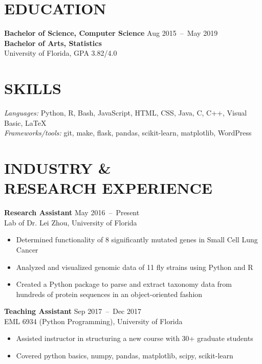 \documentclass[line,resmargin]{res}
\begin{document}
\address{}
\address{}

\begin{resume}

\section{EDUCATION}
    \textbf{Bachelor of Science, Computer Science}    \hfill Aug 2015~--~May 2019 \\
    \textbf{Bachelor of Arts, Statistics} \\
    University of Florida, GPA 3.82/4.0

\section{SKILLS}
    {\sl Languages:} Python, R, Bash, JavaScript, HTML, CSS, Java, C, C++, Visual Basic, LaTeX \\
    {\sl Frameworks/tools:} git, make, flask, pandas, scikit-learn, matplotlib, WordPress

\section{INDUSTRY \& \\ RESEARCH EXPERIENCE}
    \textbf{Research Assistant}    \hfill May 2016~--~Present \\
    Lab of Dr. Lei Zhou, University of Florida
    \begin{itemize}  \itemsep -2pt
        \item Determined functionality of 8 significantly mutated genes in Small Cell Lung Cancer
        \item Analyzed and visualized genomic data of 11 fly strains using Python and R
        \item Created a Python package to parse and extract taxonomy data from hundreds of protein sequences in an object-oriented fashion
    \end{itemize}

    \textbf{Teaching Assistant}    \hfill Sep 2017~--~Dec 2017 \\
    EML 6934 (Python Programming), University of Florida
    \begin{itemize}  \itemsep -2pt
        \item Assisted instructor in structuring a new course with 30+ graduate students
        \item Covered python basics, numpy, pandas, matplotlib, scipy, scikit-learn
    \end{itemize}


\end{resume}
\end{document}
